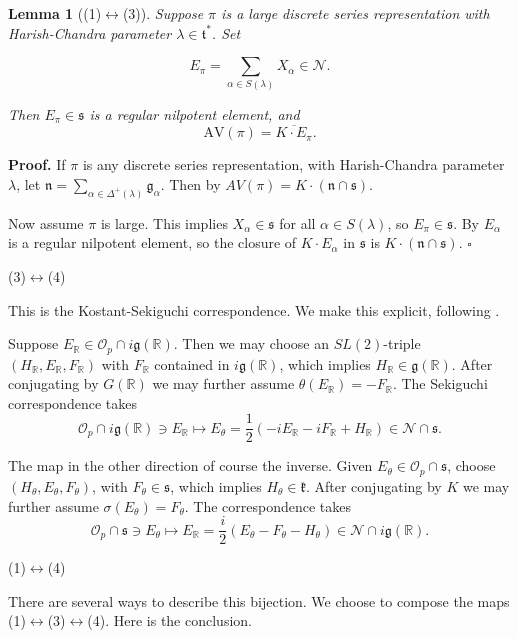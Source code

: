 \documentclass[10pt,leqno]{article}
\newtheorem{lemma}[equation]{Lemma}
\newcommand{\qed}{\hfill $\square$ \medskip}
\newenvironment{proof}[1][Proof]{\noindent\textbf{#1.} }{\qed}
\renewcommand{\O}{\mathcal O}
\newcommand{\R}{\mathbb R}
\newcommand{\N}{\mathcal N}
\newcommand{\n}{\mathfrak n}
\renewcommand{\k}{\mathfrak k}
\renewcommand{\t}{\mathfrak t}
\newcommand{\g}{\mathfrak g}
\newcommand{\s}{\mathfrak s}
\newcommand{\AV}{\mathrm{AV}}
\newcommand{\Op}{\O_p}
\begin{document}
\begin{lemma}[(1)$\leftrightarrow$(3)]
Suppose $\pi$ is a large discrete series representation with Harish-Chandra parameter $\lambda\in\t^*$.
Set

\begin{equation}
  \label{e:Epi}
  E_\pi=\sum_{\alpha\in S(\lambda)}X_\alpha\in \N.
\end{equation}

Then $E_\pi\in\s$ is a regular nilpotent element, and
$$
\AV(\pi)=\overline{K\cdot E_\pi}.
$$
\end{lemma}

\begin{proof}
If $\pi$ is any discrete series representation, with Harish-Chandra parameter $\lambda$, let
$\n=\sum_{\alpha\in\Delta^+(\lambda)}\g_\alpha$.
Then by \cite[Proposition 6.8]{vogan_irreducibility} $AV(\pi)=K\cdot(\n\cap\s)$. 

Now assume $\pi$ is large. This implies $X_\alpha\in\s$ for all $\alpha\in S(\lambda)$, so $E_\pi\in \s$. 
By \cite{kostant_tds} $E_\alpha$ is a regular nilpotent element, so the closure of $K\cdot E_\alpha$ in $\s$ is $K\cdot(\n\cap\s)$. 
\end{proof}

\medskip

\noindent (3)$\leftrightarrow$(4)

This is the Kostant-Sekiguchi correspondence. We make this explicit, following \cite[Section 1]{avav}.

Suppose $E_\R\in \Op\cap i\g(\R)$. Then we may choose an $SL(2)$-triple $(H_\R,E_\R,F_\R)$ with $F_\R$  contained in $i\g(\R)$,
which implies $H_\R\in \g(\R)$. 
After conjugating by $G(\R)$ we may further assume $\theta(E_\R)=-F_\R$.
The Sekiguchi correspondence takes
$$
\Op\cap i\g(\R)\ni E_\R\mapsto E_\theta=\frac12(-iE_\R-iF_\R+H_\R)\in \N\cap \s.
$$


The map in the other direction of course the inverse. Given 
$E_\theta\in \Op\cap\s$, choose $(H_\theta,E_\theta,F_\theta)$, with
$F_\theta\in\s$, which implies $H_\theta\in\k$. After conjugating by $K$ we may further assume $\sigma(E_\theta)=F_\theta$.
The correspondence takes
$$
\Op\cap\s\ni E_\theta\mapsto E_\R=\frac i2(E_\theta-F_\theta-H_\theta)\in\N\cap i\g(\R).
$$

\medskip

\noindent (1)$\leftrightarrow$(4)

There are several ways to describe this bijection. We choose to compose the maps (1)$\leftrightarrow$(3)$\leftrightarrow$(4).
Here is the conclusion.
\end{document}
